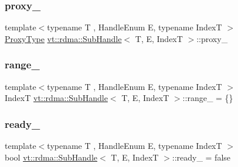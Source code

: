 \mbox{\label{structvt_1_1rdma_1_1_sub_handle_a10a5a6554a57910351679c93432af59e}} 
\subsubsection{\texorpdfstring{proxy\+\_\+}{proxy\_}}
{\footnotesize\ttfamily template$<$typename T , Handle\+Enum E, typename IndexT $>$ \\
\hyperlink{structvt_1_1rdma_1_1_sub_handle_a758bee2e499658cfef92ace83eea6590}{Proxy\+Type} \hyperlink{structvt_1_1rdma_1_1_sub_handle}{vt\+::rdma\+::\+Sub\+Handle}$<$ T, E, IndexT $>$\+::proxy\+\_\+\hspace{0.3cm}{\ttfamily [protected]}}

\mbox{\label{structvt_1_1rdma_1_1_sub_handle_a7545e2edae28878b31bfc7bccadc0171}} 
\subsubsection{\texorpdfstring{range\+\_\+}{range\_}}
{\footnotesize\ttfamily template$<$typename T , Handle\+Enum E, typename IndexT $>$ \\
IndexT \hyperlink{structvt_1_1rdma_1_1_sub_handle}{vt\+::rdma\+::\+Sub\+Handle}$<$ T, E, IndexT $>$\+::range\+\_\+ = \{\}\hspace{0.3cm}{\ttfamily [protected]}}

\mbox{\label{structvt_1_1rdma_1_1_sub_handle_a17f367f36559b48d0f18ec869e4ded8c}} 
\subsubsection{\texorpdfstring{ready\+\_\+}{ready\_}}
{\footnotesize\ttfamily template$<$typename T , Handle\+Enum E, typename IndexT $>$ \\
bool \hyperlink{structvt_1_1rdma_1_1_sub_handle}{vt\+::rdma\+::\+Sub\+Handle}$<$ T, E, IndexT $>$\+::ready\+\_\+ = false\hspace{0.3cm}{\ttfamily [protected]}}

